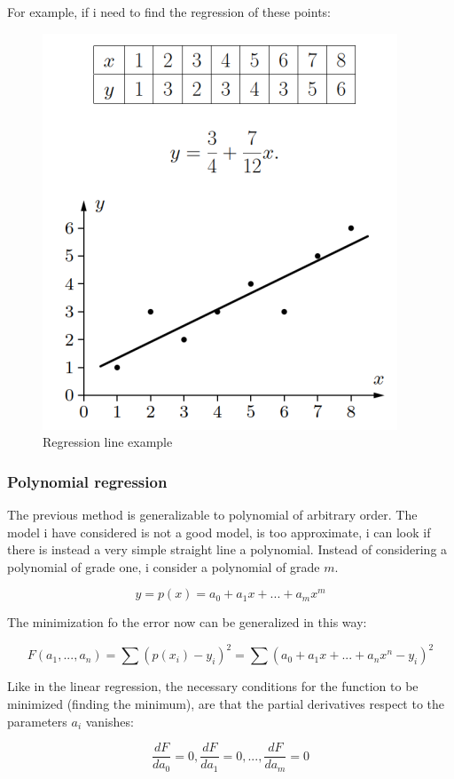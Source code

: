 \documentclass{article}
\begin{document}
For example, if i need to find the regression of these points:
\begin{figure}[H]
    \centering
    \includegraphics[scale=0.7]{images/regression_line.png}
    \caption{Regression line example}
    \label{fig:regression_line}
\end{figure}

\subsubsection{Polynomial regression}
The previous method is generalizable to polynomial of arbitrary order.
The model i have considered is not a good model, is too approximate, i can look if there
is instead a very simple straight line a polynomial.
Instead of considering a polynomial of grade one, i consider a polynomial of grade $m$.

$$y=p(x)=a_0+a_1x+...+a_m x^m$$

The minimization fo the error now can be generalized in this way:

$$F(a_1,...,a_n)=\sum (p(x_i)-y_i)^2=\sum(a_0+a_1x+...+a_n x^n-y_i)^2$$

Like in the linear regression, the necessary conditions for the function to be
minimized (finding the minimum), are that the partial derivatives respect to the
parameters $a_i$ vanishes:

$$\frac{dF}{da_0}=0,\frac{dF}{da_1}=0,...,\frac{dF}{da_m}=0$$
\end{document}
